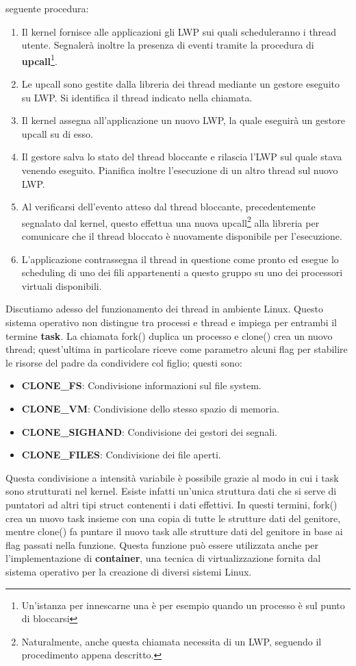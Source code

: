seguente procedura: \begin{enumerate}
	\item Il kernel fornisce alle applicazioni gli LWP sui quali scheduleranno i thread utente. Segnalerà inoltre la presenza di eventi tramite la
	procedura di \textbf{upcall}\footnote{Un'istanza per innescarne una è per esempio quando un processo è sul punto di bloccarsi}.
	\item Le upcall sono gestite dalla libreria dei thread mediante un gestore eseguito su LWP. Si identifica il thread indicato nella chiamata.
	\item Il kernel assegna all'applicazione un nuovo LWP, la quale eseguirà un gestore upcall su di esso.
	\item Il gestore salva lo stato del thread bloccante e rilascia l'LWP sul quale stava venendo eseguito. Pianifica inoltre l'esecuzione di un altro
	thread sul nuovo LWP.
	\item Al verificarsi dell'evento atteso dal thread bloccante, precedentemente segnalato dal kernel, questo effettua una nuova upcall\footnote{
	Naturalmente, anche questa chiamata necessita di un LWP, seguendo il procedimento appena descritto.} alla libreria per comunicare che il thread
	bloccato è nuovamente disponibile per l'esecuzione.
	\item L'applicazione contrassegna il thread in questione come pronto ed esegue lo scheduling di uno dei fili appartenenti a questo gruppo su uno
	dei processori virtuali disponibili.
\end{enumerate}

\noindent Discutiamo adesso del funzionamento dei thread in ambiente Linux. Questo sistema operativo non distingue tra processi e thread e impiega per
entrambi il termine \textbf{task}. La chiamata fork() duplica un processo e clone() crea un nuovo thread; quest'ultima in particolare riceve come
parametro alcuni flag per stabilire le risorse del padre da condividere col figlio; questi sono: \begin{itemize}
	\item \textbf{CLONE\_FS}: Condivisione informazioni sul file system.
	\item \textbf{CLONE\_VM}: Condivisione dello stesso spazio di memoria.
	\item \textbf{CLONE\_SIGHAND}: Condivisione dei gestori dei segnali.
	\item \textbf{CLONE\_FILES}: Condivisione dei file aperti.
\end{itemize}

\noindent Questa condivisione a intensità variabile è possibile grazie al modo in cui i task sono strutturati nel kernel. Esiste infatti un'unica
struttura dati che si serve di puntatori ad altri tipi struct contenenti i dati effettivi. In questi termini, fork() crea un nuovo task insieme con una
copia di tutte le strutture dati del genitore, mentre clone() fa puntare il nuovo task alle strutture dati del genitore in base ai flag passati nella
funzione. Questa funzione può essere utilizzata anche per l'implementazione di \textbf{container}, una tecnica di virtualizzazione fornita dal sistema
operativo per la creazione di diversi sistemi Linux.